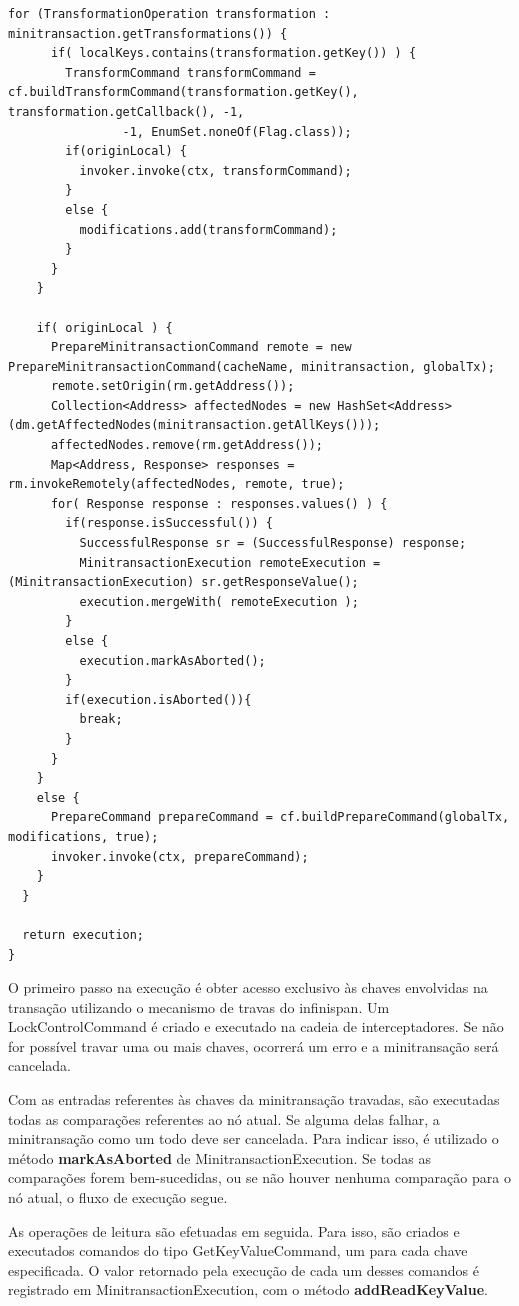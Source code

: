 \documentclass[11pt,twoside,a4paper]{book}
\begin{document}
\begin{lstlisting}[caption={Função PrepareMinitransactionCommand.perform}, label=lst:perform]
    for (TransformationOperation transformation : minitransaction.getTransformations()) {
      if( localKeys.contains(transformation.getKey()) ) {
        TransformCommand transformCommand = cf.buildTransformCommand(transformation.getKey(), transformation.getCallback(), -1,
                -1, EnumSet.noneOf(Flag.class));
        if(originLocal) {
          invoker.invoke(ctx, transformCommand);
        }
        else {
          modifications.add(transformCommand);
        }
      }
    }
         
    if( originLocal ) {
      PrepareMinitransactionCommand remote = new PrepareMinitransactionCommand(cacheName, minitransaction, globalTx);
      remote.setOrigin(rm.getAddress());
      Collection<Address> affectedNodes = new HashSet<Address>(dm.getAffectedNodes(minitransaction.getAllKeys()));
      affectedNodes.remove(rm.getAddress());
      Map<Address, Response> responses = rm.invokeRemotely(affectedNodes, remote, true);
      for( Response response : responses.values() ) {
        if(response.isSuccessful()) {
          SuccessfulResponse sr = (SuccessfulResponse) response;
          MinitransactionExecution remoteExecution = (MinitransactionExecution) sr.getResponseValue();
          execution.mergeWith( remoteExecution );
        }
        else {
          execution.markAsAborted();
        }
        if(execution.isAborted()){
          break;
        }
      }
    }
    else {
      PrepareCommand prepareCommand = cf.buildPrepareCommand(globalTx, modifications, true);
      invoker.invoke(ctx, prepareCommand);
    }
  }

  return execution;
}
\end{lstlisting}

O primeiro passo na execução é obter acesso exclusivo às chaves envolvidas na transação utilizando o mecanismo de travas do infinispan. Um LockControlCommand é criado e executado na cadeia de interceptadores. Se não for possível travar uma ou mais chaves, ocorrerá um erro e a minitransação será cancelada.

Com as entradas referentes às chaves da minitransação travadas, são executadas todas as comparações referentes ao nó atual. Se alguma delas falhar, a minitransação como um todo deve ser cancelada. Para indicar isso, é utilizado o método \textbf{markAsAborted} de MinitransactionExecution. Se todas as comparações forem bem-sucedidas, ou se não houver nenhuma comparação para o nó atual, o fluxo de execução segue.

As operações de leitura são efetuadas em seguida. Para isso, são criados e executados comandos do tipo GetKeyValueCommand, um para cada chave especificada. O valor retornado pela execução de cada um desses comandos é registrado em MinitransactionExecution, com o método \textbf{addReadKeyValue}.
\end{document}
